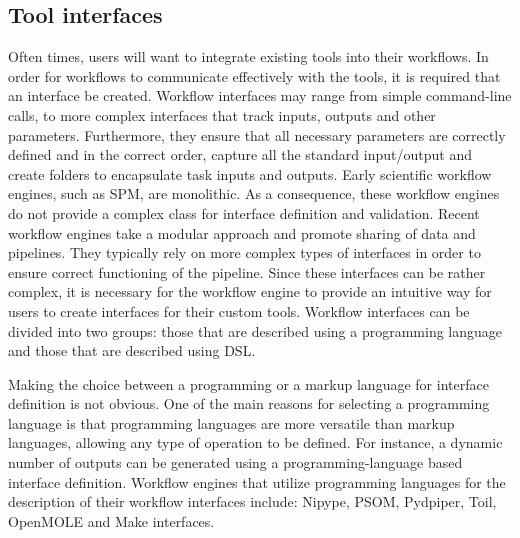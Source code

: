         \subsection{Tool interfaces}\label{mod}
        Often times, users will want to
            integrate existing tools into their workflows. In order for
            workflows to communicate effectively with the tools, it is required
            that an interface be created. Workflow interfaces may range from
            simple command-line calls, to more complex interfaces that track
            inputs, outputs and other parameters. Furthermore, they ensure that
            all necessary parameters are correctly defined and in the correct
            order,  capture all the standard input/output and create folders
            to encapsulate task inputs and outputs. Early scientific workflow
            engines, such as SPM, are monolithic. As a consequence, these
            workflow engines do not provide a complex class for interface
            definition and validation. Recent workflow engines take a modular
            approach and promote sharing of data and pipelines. They typically
            rely on more complex types of interfaces in order to ensure correct
            functioning of the pipeline. Since these interfaces can be rather
            complex, it is necessary for the workflow engine to provide an
            intuitive way for users to create interfaces for their custom tools.
            Workflow interfaces can be divided into two groups: those that are
            described using a programming language and those that are described
            using DSL.

            Making the choice between a programming or a markup language for
            interface definition is not obvious. One of the main reasons for
            selecting a programming language is that programming languages are
            more versatile than markup languages, allowing any type of
            operation to be defined. For instance, a dynamic number of outputs
            can be generated using a programming-language based interface
            definition. Workflow engines that utilize programming languages for
            the description of their workflow interfaces include: Nipype, PSOM,
            Pydpiper, Toil, OpenMOLE and Make interfaces. 
          
